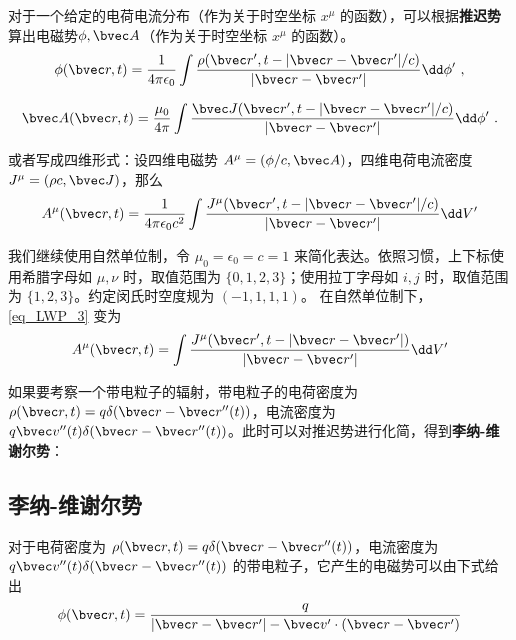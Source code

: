 

对于一个给定的电荷电流分布（作为关于时空坐标 $x^\mu$ 的函数），可以根据\textbf{推迟势}算出电磁势$\phi,\bvec A$（作为关于时空坐标 $x^\mu$ 的函数）。
\begin{equation}
\phi(\bvec r,t)=\frac{1}{4\pi\epsilon_0}\int \frac{\rho(\bvec r',t-|\bvec r-\bvec r'|/c)}{|\bvec r-\bvec r'|}\dd \phi'~,
\end{equation}

\begin{equation}
\bvec A(\bvec r,t)=\frac{\mu_0}{4\pi}\int \frac{\bvec J(\bvec r',t-|\bvec r-\bvec r'|/c)}{|\bvec r-\bvec r'|}\dd \phi'~.
\end{equation}

或者写成四维形式：设四维电磁势 $A^\mu=(\phi/c,\bvec A)$，四维电荷电流密度 $J^\mu=(\rho c,\bvec J)$，那么
\begin{equation}\label{eq_LWP_3}
A^\mu(\bvec r,t)=\frac{1}{4\pi\epsilon_0c^2}\int \frac{J^\mu(\bvec r',t-|\bvec r-\bvec r'|/c)}{|\bvec r-\bvec r'|}\dd V'
\end{equation}

我们继续使用自然单位制，令 $\mu_0=\epsilon_0=c=1$ 来简化表达。依照习惯，上下标使用希腊字母如 $\mu, \nu$ 时，取值范围为 $\{0, 1, 2, 3\}$；使用拉丁字母如 $i, j$ 时，取值范围为 $\{1, 2, 3\}$。约定闵氏时空度规为 $(-1,1,1,1)$。
在自然单位制下，\autoref{eq_LWP_3} 变为
\begin{equation}\label{eq_LWP_4}
A^\mu(\bvec r,t)=\int \frac{J^\mu(\bvec r',t-|\bvec r-\bvec r'|)}{|\bvec r-\bvec r'|}\dd V'
\end{equation}

如果要考察一个带电粒子的辐射，带电粒子的电荷密度为 $\rho(\bvec r,t)=q\delta(\bvec r-\bvec r''(t))$，电流密度为 $q\bvec v''(t) \delta(\bvec r-\bvec r''(t))$。此时可以对推迟势进行化简，得到\textbf{李纳-维谢尔势}：
\subsection{李纳-维谢尔势}

对于电荷密度为 $\rho(\bvec r,t)=q\delta(\bvec r-\bvec r''(t))$，电流密度为 $q\bvec v''(t) \delta(\bvec r-\bvec r''(t))$ 的带电粒子，它产生的电磁势可以由下式给出
\begin{equation}\label{eq_LWP_1}
\phi(\bvec r,t)=\frac{q}{|\bvec r-\bvec r'|-\bvec v'\cdot (\bvec r-\bvec r')}
\end{equation}

